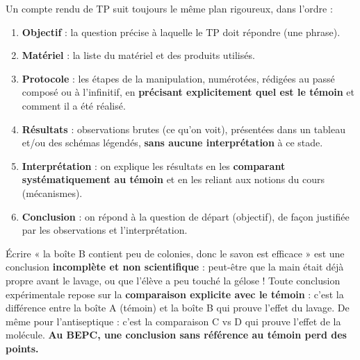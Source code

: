 \documentclass[11pt]{article}
\begin{document}
\begin{methode}
Un compte rendu de TP suit toujours le même plan rigoureux, dans l'ordre :
\begin{enumerate}
\item \textbf{Objectif} : la question précise à laquelle le TP doit répondre (une phrase).
\item \textbf{Matériel} : la liste du matériel et des produits utilisés.
\item \textbf{Protocole} : les étapes de la manipulation, numérotées, rédigées au passé composé ou à l'infinitif, en \textbf{précisant explicitement quel est le témoin} et comment il a été réalisé.
\item \textbf{Résultats} : observations brutes (ce qu'on voit), présentées dans un tableau et/ou des schémas légendés, \textbf{sans aucune interprétation} à ce stade.
\item \textbf{Interprétation} : on explique les résultats en les \textbf{comparant systématiquement au témoin} et en les reliant aux notions du cours (mécanismes).
\item \textbf{Conclusion} : on répond à la question de départ (objectif), de façon justifiée par les observations et l'interprétation.
\end{enumerate}
\end{methode}

\begin{attention}
Écrire « la boîte B contient peu de colonies, donc le savon est efficace » est une conclusion \textbf{incomplète et non scientifique} : peut-être que la main était déjà propre avant le lavage, ou que l'élève a peu touché la gélose ! Toute conclusion expérimentale repose sur la \textbf{comparaison explicite avec le témoin} : c'est la différence entre la boîte A (témoin) et la boîte B qui prouve l'effet du lavage. De même pour l'antiseptique : c'est la comparaison C vs D qui prouve l'effet de la molécule. \textbf{Au BEPC, une conclusion sans référence au témoin perd des points.}
\end{attention}
\end{document}
